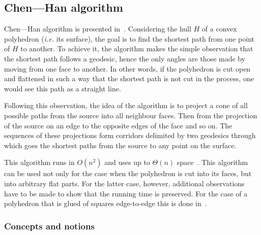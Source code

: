 
\subsection{Chen—Han algorithm}

Chen—Han algorithm is presented in~\cite{chen-han}. Considering the hull $H$ of a convex polyhedron (\textit{i.e.} its surface), the goal is to find the shortest path from one point of $H$ to another. To achieve it, the algorithm makes the simple observation that the shortest path follows a geodesic, hence the only angles are those made by moving from one face to another. In other words, if the polyhedron is cut open and flattened in such a way that the shortest path is not cut in the process, one would see this path as a straight line.\par
Following this observation, the idea of the algorithm is to project a cone of all possible paths from the source into all neighbour faces. Then from the projection of the source on an edge to the opposite edges of the face and so on. The sequences of these projections form corridors delimited by two geodesics through which goes the shortest paths from the source to any point on the surface.\par
This algorithm runs in $O(n^2)$ and uses up to $\Theta(n)$ space~\cite{chen-han}. This algorithm can be used not only for the case when the polyhedron is cut into its faces, but into arbitrary flat parts. For the latter case, however, additional observations have to be made to show that the running time is preserved. For the case of a polyhedron that is glued of squares edge-to-edge this is done in~\cite{z-bachthesis}.

\subsubsection{Concepts and notions}

